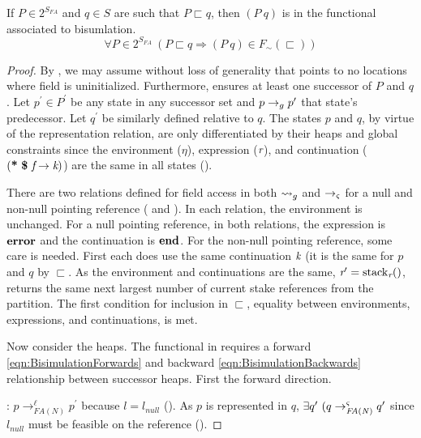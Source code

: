\begin{lemma}
If $P \in 2^{S_\mathit{FA}}$ and $q \in S$ are such that $P \sqsubset q$, then $(P\ q)$ is in the functional associated to bisumlation.
\label{lem:access}
$$
\forall P \in 2^{S_\mathit{FA}}\ (P \sqsubset q \Rightarrow (P\ q) \in F_\sim(\sqsubset))
$$
\end{lemma}

\begin{proof}

By , we may assume without loss of generality that  points to no locations where field  is uninitialized. Furthermore,  ensures at least one successor of $P$ and $q$. Let $p^\prime \in P^\prime$ be any
state in any successor set and $p \rightarrow_{g} p^\prime$ that state's
predecessor. Let $q^\prime$ be similarly defined relative to $q$.  The states $p$ and $q$, by virtue of the
representation relation, are only differentiated by their heaps and
global constraints since the environment ($\eta$), expression ($\emph{r}$),
and continuation ($\lp \cfgt{*}\ \cfgt{\$}\ \cfgnt{f} \rightarrow
\cfgnt{k}\rp$) are the same in all states 
(). 

There are two relations defined for field access in both $\leadsto_{g}$ and
$\rightarrow_{\varsigma}$ for a null and non-null pointing reference (
and ). In each relation, the environment is
unchanged. For a null pointing reference, in both relations, the
expression is $\textbf{error}$ and the continuation is $\textbf{end}$. For
the non-null pointing reference, some care is needed. First each does
use the same continuation $\emph{k}$ (it is the same for $p$ and $q$
by $\sqsubset$. As the environment and continuations are the same,
$\emph{r}^\prime = \mathrm{stack}_{\emph{r}}()$, returns the same next largest
number of current stake references from the partition. The first
condition for inclusion in $\sqsubset$, equality between environments,
expressions, and continuations, is met.

Now consider the heaps.  The functional in  requires a forward
\eqref{eqn:BisimulationForwards} and backward
\eqref{eqn:BisimulationBackwards} relationship between successor
heaps. First the forward direction.

: $p \rightarrow^\ell_\mathit{FA(N)}
p^\prime$ because $l = l_\mathit{null}$ (). As $p$
is represented in $q$, $\exists q^\prime\ (q
\rightarrow^{\varsigma}_\mathit{FA(N)} q^\prime$ since $l_{\mathit{null}}$
must be feasible on the reference (). 


\end{proof}
